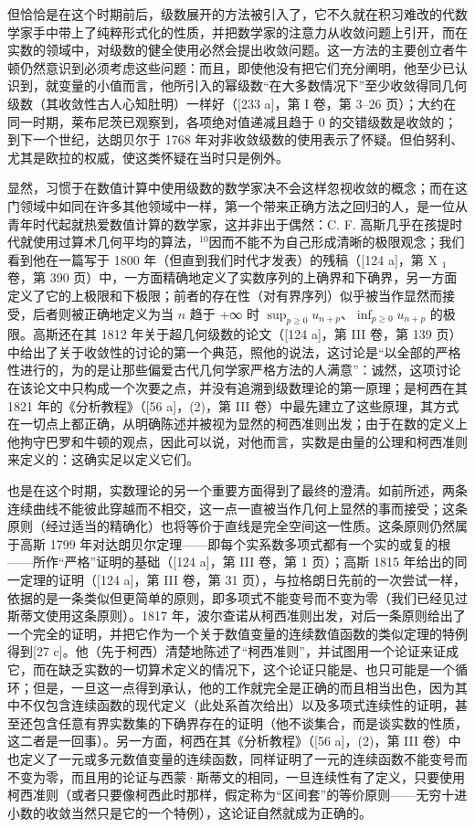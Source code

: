 但恰恰是在这个时期前后，级数展开的方法被引入了，它不久就在积习难改的代数学家手中带上了纯粹形式化的性质，并把数学家的注意力从收敛问题上引开，而在实数的领域中，对级数的健全使用必然会提出收敛问题。这一方法的主要创立者牛顿仍然意识到必须考虑这些问题：而且，即使他没有把它们充分阐明，他至少已认识到，就变量的小值而言，他所引入的幂级数“在大多数情况下”至少收敛得同几何级数（其收敛性古人心知肚明）一样好（{[}233 a{]}，第 I 卷，第 3–26 页）；大约在同一时期，莱布尼茨已观察到，各项绝对值递减且趋于 0 的交错级数是收敛的；到下一个世纪，达朗贝尔于 1768 年对非收敛级数的使用表示了怀疑。但伯努利、尤其是欧拉的权威，使这类怀疑在当时只是例外。

显然，习惯于在数值计算中使用级数的数学家决不会这样忽视收敛的概念；而在这门领域中如同在许多其他领域中一样，第一个带来正确方法之回归的人，是一位从青年时代起就热爱数值计算的数学家，这并非出于偶然：C. F. 高斯几乎在孩提时代就使用过算术几何平均的算法，\(^{10}\)因而不能不为自己形成清晰的极限观念；我们看到他在一篇写于 1800 年（但直到我们时代才发表）的残稿（{[}124 a{]}，第 X \(_1\) 卷，第 390 页）中，一方面精确地定义了实数序列的上确界和下确界，另一方面定义了它的上极限和下极限；前者的存在性（对有界序列）似乎被当作显然而接受，后者则被正确地定义为当 \(n\) 趋于 +∞ 时 \(\sup_{p≥0} u_{n+p}\)、\(\inf_{p≥0} u_{n+p}\) 的极限。高斯还在其 1812 年关于超几何级数的论文（{[}124 a{]}，第 III 卷，第 139 页）中给出了关于收敛性的讨论的第一个典范，照他的说法，这讨论是“以全部的严格性进行的，为的是让那些偏爱古代几何学家严格方法的人满意”：诚然，这项讨论在该论文中只构成一个次要之点，并没有追溯到级数理论的第一原理；是柯西在其 1821 年的《分析教程》（{[}56 a{]}，(2)，第 III 卷）中最先建立了这些原理，其方式在一切点上都正确，从明确陈述并被视为显然的柯西准则出发；由于在数的定义上他拘守巴罗和牛顿的观点，因此可以说，对他而言，实数是由量的公理和柯西准则来定义的：这确实足以定义它们。

也是在这个时期，实数理论的另一个重要方面得到了最终的澄清。如前所述，两条连续曲线不能彼此穿越而不相交，这一点一直被当作几何上显然的事而接受；这条原则（经过适当的精确化）也将等价于直线是完全空间这一性质。这条原则仍然属于高斯 1799 年对达朗贝尔定理——即每个实系数多项式都有一个实的或复的根——所作“严格”证明的基础（{[}124 a{]}，第 III 卷，第 1 页）；高斯 1815 年给出的同一定理的证明（{[}124 a{]}，第 III 卷，第 31 页），与拉格朗日先前的一次尝试一样，依据的是一条类似但更简单的原则，即多项式不能变号而不变为零（我们已经见过斯蒂文使用这条原则）。1817 年，波尔查诺从柯西准则出发，对后一条原则给出了一个完全的证明，并把它作为一个关于数值变量的连续数值函数的类似定理的特例得到{[}27 c{]}。他（先于柯西）清楚地陈述了“柯西准则”，并试图用一个论证来证成它，而在缺乏实数的一切算术定义的情况下，这个论证只能是、也只可能是一个循环；但是，一旦这一点得到承认，他的工作就完全是正确的而且相当出色，因为其中不仅包含连续函数的现代定义（此处系首次给出）以及多项式连续性的证明，甚至还包含任意有界实数集的下确界存在的证明（他不谈集合，而是谈实数的性质，这二者是一回事）。另一方面，柯西在其《分析教程》（{[}56 a{]}，(2)，第 III 卷）中也定义了一元或多元数值变量的连续函数，同样证明了一元的连续函数不能变号而不变为零，而且用的论证与西蒙·斯蒂文的相同，一旦连续性有了定义，只要使用柯西准则（或者只要像柯西此时那样，假定称为“区间套”的等价原则——无穷十进小数的收敛当然只是它的一个特例），这论证自然就成为正确的。

